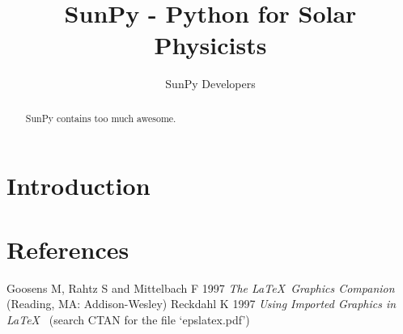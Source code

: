 \documentclass[12pt]{iopart}
\begin{document}
\title{SunPy - Python for Solar Physicists}

\author{SunPy Developers}

\address{The Internet}
\begin{abstract}

SunPy contains too much awesome.

\end{abstract}

\maketitle

\section{Introduction}

\section*{References}
\begin{thebibliography}{10}
 Goosens M, Rahtz S and Mittelbach F 1997 {\it The \LaTeX\ Graphics Companion\/} 
(Reading, MA: Addison-Wesley)
 Reckdahl K 1997 {\it Using Imported Graphics in \LaTeX\ } (search CTAN for the file `epslatex.pdf')
\end{thebibliography}
\end{document}
